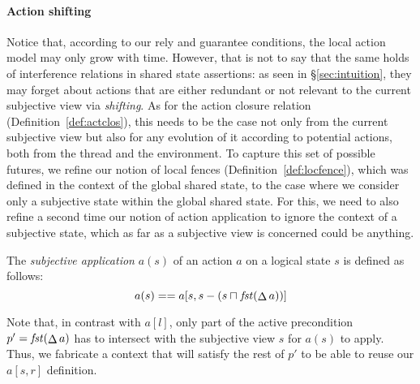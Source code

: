 \paragraph{Action shifting}
Notice that, according to our rely and guarantee conditions, the local
action model may only grow with time. However, that is not to say that
the same holds of interference relations in shared state assertions:
as seen in \S\ref{sec:intuition}, they may forget about actions that
are either redundant or not relevant to the current subjective
view via \emph{shifting}. As for the action closure relation
(Definition~\ref{def:actclos}), this needs to be the case not only
from the current subjective view but also for any evolution of it
according to potential actions, both from the thread and the
environment. To capture this set of possible futures, we refine our
notion of local fences (Definition~\ref{def:locfence}), which was
defined in the context of the global shared state, to the case where
we consider only a subjective state within the global shared state.
For this, we need to also refine a second time our notion of action
application to ignore the context of a subjective state, which as far
as a subjective view is concerned could be anything.


\begin{definition}
  The \emph{subjective application} $a(s)$ of an action $a$ on a
  logical state $s$ is defined as follows:
  \[
  a(s) == a[s,s - (s\sqcap_{} \mathit{fst}(\mathop{\Delta} a))]
  \]
\end{definition}

Note that, in contrast with $a[l]$, only part of the active
precondition $p' = \mathit{fst}(\mathop{\Delta} a)$ has to intersect with the
subjective view $s$ for $a(s)$ to apply. Thus, we fabricate a context
that will satisfy the rest of $p'$ to be able to reuse our $a[s,r]$
definition.

